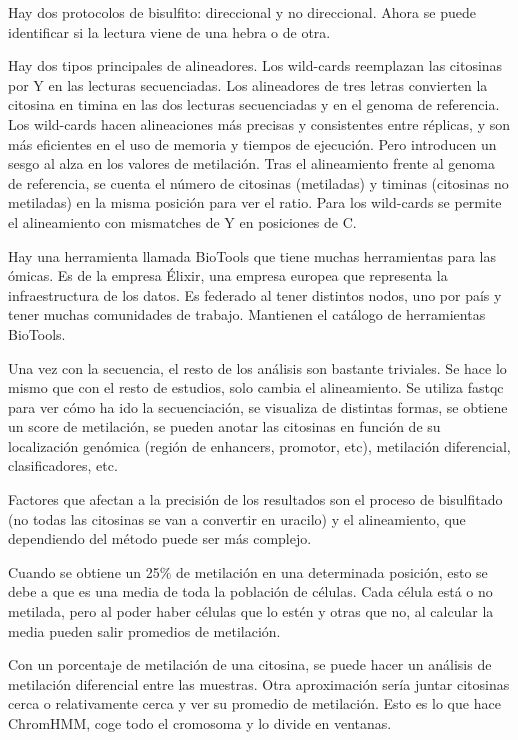 Hay dos protocolos de bisulfito: direccional y no direccional. Ahora se puede identificar si la lectura viene de una hebra o de otra. 

Hay dos tipos principales de alineadores. Los wild-cards reemplazan las citosinas por Y en las lecturas secuenciadas. Los alineadores de tres letras convierten la citosina en timina en las dos lecturas secuenciadas y en el genoma de referencia. 
Los wild-cards hacen alineaciones más precisas y consistentes entre réplicas, y son más eficientes en el uso de memoria y tiempos de ejecución. Pero introducen un sesgo al alza en los valores de metilación. Tras el alineamiento frente al genoma de referencia, se cuenta el número de citosinas (metiladas) y timinas (citosinas no metiladas) en la misma posición para ver el ratio. Para los wild-cards se permite el alineamiento con mismatches de Y en posiciones de C. 

Hay una herramienta llamada BioTools que tiene muchas herramientas para las ómicas. Es de la empresa Élixir, una empresa europea que representa la infraestructura de los datos. Es federado al tener distintos nodos, uno por país y tener muchas comunidades de trabajo. Mantienen el catálogo de herramientas BioTools. 

Una vez con la secuencia, el resto de los análisis son bastante triviales. Se hace lo mismo que con el resto de estudios, solo cambia el alineamiento. Se utiliza fastqc para ver cómo ha ido la secuenciación, se visualiza de distintas formas, se obtiene un score de metilación, se pueden anotar las citosinas en función de su localización genómica (región de enhancers, promotor, etc), metilación diferencial, clasificadores, etc.

Factores que afectan a la precisión de los resultados son el proceso de bisulfitado (no todas las citosinas se van a convertir en uracilo) y el alineamiento, que dependiendo del método puede ser más complejo. 

Cuando se obtiene un 25\% de metilación en una determinada posición, esto se debe a que es una media de toda la población de células. Cada célula está o no metilada, pero al poder haber células que lo estén y otras que no, al calcular la media pueden salir promedios de metilación. 

Con un porcentaje de metilación de una citosina, se puede hacer un análisis de metilación diferencial entre las muestras. Otra aproximación sería juntar citosinas cerca o relativamente cerca y ver su promedio de metilación. Esto es lo que hace ChromHMM, coge todo el cromosoma y lo divide en ventanas. 

